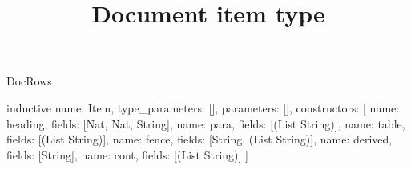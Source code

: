 \begin{lexlean}{DocRows}
\title{Document item type}
\begin{semanticmodule}
inductive{
  name: Item,
  type_parameters: [],
  parameters: [],
  constructors: [
    {name: heading, fields: [Nat, Nat, String]},
    {name: para, fields: [(List String)]},
    {name: table, fields: [(List String)]},
    {name: fence, fields: [String, (List String)]},
    {name: derived, fields: [String]},
    {name: cont, fields: [(List String)]}
  ]
}
\end{semanticmodule}
\end{lexlean}
